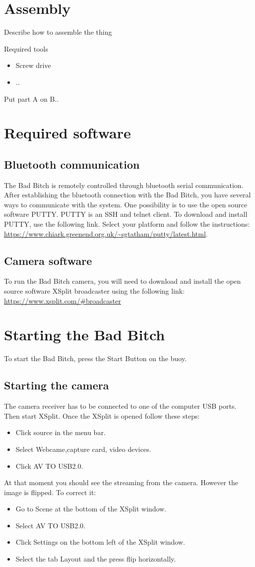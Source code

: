 \documentclass[letterpaper, 12 pt]{article}
\begin{document}
\section{Assembly}
Describe how to assemble the thing

Required tools
\begin{itemize}
\item Screw drive
\item ..
\end{itemize}

Put part A on B..
\section{Required software}
\subsection{Bluetooth communication}
The Bad Bitch is remotely controlled through bluetooth serial communication. After establishing the bluetooth connection with the Bad Bitch, you have several ways to communicate with the system. One possibility is to use the open source software PUTTY. PUTTY is an SSH and telnet client. To download and install PUTTY, use the following link. Select your platform and follow the instructions:
\url{https://www.chiark.greenend.org.uk/~sgtatham/putty/latest.html}.
\subsection{Camera software}
To run the Bad Bitch camera, you will need to download and install the open source software XSplit broadcaster using the following link:
\url{https://www.xsplit.com/#broadcaster}
\section{Starting the Bad Bitch}
To start the Bad Bitch, press the Start Button on the buoy.
\subsection{Starting the camera}
The camera receiver has to be connected to one of the computer USB ports. Then start XSplit. Once the XSplit is opened follow these steps:
\begin{itemize}
\item Click source in the menu bar.
\item Select Webcame,capture card, video devices.
\item Click AV TO USB2.0.
\end{itemize}
At that moment you should see the streaming from the camera. However the image is flipped. To correct it:
\begin{itemize}
\item Go to Scene at the bottom of the XSplit window.
\item Select AV TO USB2.0.
\item Click Settings on the bottom left of the XSplit window.
\item Select the tab Layout and the press flip horizontally.
\end{itemize}
\end{document}
